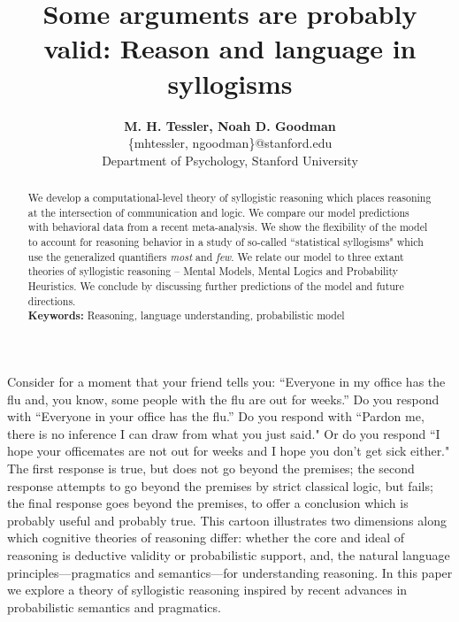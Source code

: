 \documentclass[10pt,letterpaper]{article}
\begin{document}
\title{Some arguments are probably valid: Reason and language in syllogisms}
 
\author{{\large \bf M. H. Tessler, Noah D. Goodman } \\
	\{mhtessler, ngoodman\}@stanford.edu \\
  Department of Psychology, Stanford University}

\maketitle


\begin{abstract}
We develop a computational-level theory of syllogistic reasoning which places reasoning at the intersection of communication and logic. We compare our model predictions with behavioral data from a recent meta-analysis. We show the flexibility of the model to account for reasoning behavior in a study of so-called ``statistical syllogisms" which use the generalized quantifiers \emph{most} and \emph{few}. We relate our model to three extant theories of syllogistic reasoning -- Mental Models, Mental Logics and Probability Heuristics. We conclude by discussing further predictions of the model and future directions.  
\\
\textbf{Keywords:} 
Reasoning, language understanding, probabilistic model
\end{abstract}


Consider for a moment that your friend tells you:
``Everyone in my office has the flu and, you know, some people with the flu are out for weeks.''
Do you respond with
``Everyone in your office has the flu.''
Do you respond with
``Pardon me, there is no inference I can draw from what you just said."
Or do you respond
 ``I hope your officemates are not out for weeks and I hope you don't get sick either."
 The first response is true, but does not go beyond the premises; the second response attempts to go beyond the premises by strict classical logic, but fails; the final response goes beyond the premises, to offer a conclusion which is probably useful and probably true.
% 
This cartoon illustrates two dimensions along which cognitive theories of reasoning differ: whether the core and ideal of reasoning is deductive validity or probabilistic support, and, the natural language principles---pragmatics and semantics---for understanding reasoning. In this paper we explore a theory of syllogistic reasoning inspired by recent advances in probabilistic semantics and pragmatics.
\end{document}

